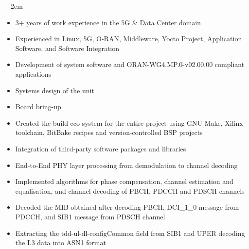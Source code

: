 \documentclass[11pt, letterpaper]{altacv}
\makeatletter
\renewcommand{\makecvheader}{%
  \begingroup
    \begin{minipage}{0.6\linewidth} %
      \raggedright\color{emphasis}%
      {\Huge\bfseries\MakeUppercase{\@name}\par}
      \medskip
      {\large\bfseries\color{accent}\@tagline\par}
    \end{minipage}
    \hfill
    \begin{minipage}{0.25\linewidth} %
      {\raggedright\footnotesize\bfseries\@personalinfo\par}
    \end{minipage}
  \endgroup\medskip
}
\renewenvironment{fullwidth}{%
  \begin{adjustwidth}{}
  {\dimexpr-\marginparwidth-\marginparsep-2em\relax} %
  }
  {\end{adjustwidth}}
\makeatother
\begin{document}

\begin{fullwidth}
 \makecvheader
\end{fullwidth}

\begin{itemize}
\item 3+ years of work experience in the 5G \& Data Center domain
\item Experienced in Linux, 5G, O-RAN, Middleware, Yocto Project, Application Software, and Software Integration
\end{itemize}


\begin{itemize}
\item Development of system software and ORAN-WG4.MP.0-v02.00.00 compliant applications
\item Systems design of the unit
\item Board bring-up
\item Created the build eco-system for the entire project using GNU Make, Xilinx toolchain, BitBake recipes and version-controlled BSP projects
\item Integration of third-party software packages and libraries
\end{itemize}

\vspace{0.5cm}

\begin{itemize}
\item End-to-End PHY layer processing from demodulation to channel decoding
\item Implemented algorithms for phase compensation, channel estimation and equalisation, and channel decoding of PBCH, PDCCH and PDSCH channels
\item Decoded the MIB obtained after decoding PBCH, DCI\_1\_0 message from PDCCH, and SIB1 message from PDSCH channel
\item Extracting the tdd-ul-dl-conﬁgCommon field from SIB1 and UPER decoding the L3 data into ASN1 format
\end{itemize}
\end{document}
